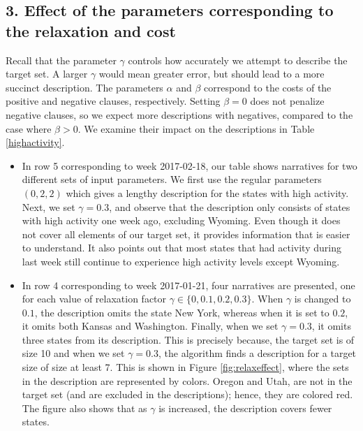 
\subsection*{3. Effect of the parameters corresponding to the relaxation and cost}
Recall that the parameter $\gamma$ controls how accurately we attempt to describe the
target set. A larger $\gamma$ would mean greater error, but should lead to a more succinct
description.  The parameters $\alpha$ and $\beta$ correspond to the costs of the
positive and negative clauses, respectively. Setting $\beta=0$ does not penalize negative
clauses, so we expect more descriptions with negatives, compared to the case where $\beta >0$.
We examine their impact on the descriptions in Table \ref{highactivity}.

\begin{itemize}
\item In row 5 corresponding to week 2017-02-18, our table shows narratives for two different sets of input parameters. We first use the regular parameters $(0, 2, 2)$ which gives a lengthy description for the states with high activity. 
Next, we set $\gamma=0.3$, and observe that the description only consists of
states with high activity one week ago, excluding Wyoming. 
Even though it does not cover all elements of our target set, it provides information that is easier to understand. 
It also points out that most states that had activity during last week still continue to experience high activity levels except Wyoming. 
\item In row 4 corresponding to week 2017-01-21, four narratives are presented, 
one for each value of relaxation factor $\gamma\in \{0, 0.1, 0.2, 0.3 \}$. 
When $\gamma$ is changed to $0.1$, the description omits the state New York, 
whereas when it is set to $0.2$, it omits both Kansas and Washington. 
Finally, when we set $\gamma = 0.3$, it omits three states from its description. 
This is precisely because, the target set is of size 10 and when we set $\gamma = 0.3$, 
the algorithm finds a description for a target size of size at least 7. 
This is shown in Figure \ref{fig:relaxeffect}, where the sets in the description 
are represented by colors. Oregon and Utah, are not in the target set (and are excluded in
the descriptions); hence, they are colored red. The figure also shows that as $\gamma$ is 
increased, the description covers fewer states. 
\end{itemize}

